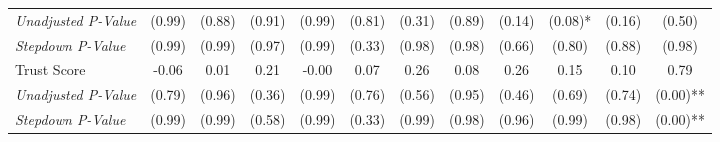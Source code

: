 \begin{tabular}{l c c c c c c c c c c c}
\quad \textit{Unadjusted P-Value} & (0.99) & (0.88) & (0.91) & (0.99) & (0.81) & (0.31) & (0.89) & (0.14) & (0.08)* & (0.16) & (0.50) \\
\quad \textit{Stepdown P-Value} & (0.99) & (0.99) & (0.97) & (0.99) & (0.33) & (0.98) & (0.98) & (0.66) & (0.80) & (0.88) & (0.98) \\
Trust Score & -0.06 & 0.01 & 0.21 & -0.00 & 0.07 & 0.26 & 0.08 & 0.26 & 0.15 & 0.10 & 0.79 \\
\quad \textit{Unadjusted P-Value} & (0.79) & (0.96) & (0.36) & (0.99) & (0.76) & (0.56) & (0.95) & (0.46) & (0.69) & (0.74) & (0.00)** \\
\quad \textit{Stepdown P-Value} & (0.99) & (0.99) & (0.58) & (0.99) & (0.33) & (0.99) & (0.98) & (0.96) & (0.99) & (0.98) & (0.00)** \\
\bottomrule
\end{tabular}
